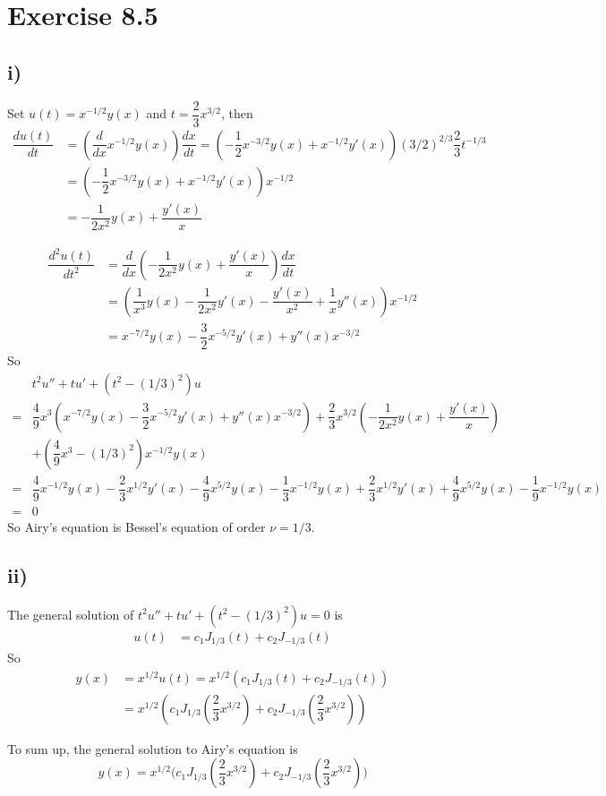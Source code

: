 \documentclass[a4paper,12pt,titlepage]{article}
\begin{document}
\section*{Exercise 8.5}
\subsection*{i)}
Set $u(t)=x^{-1/2}y(x)$ and $t=\dfrac{2}{3}x^{3/2}$, then
\begin{align*}
\dfrac{du(t)}{dt}&=(\dfrac{d}{dx}x^{-1/2}y(x))\dfrac{dx}{dt}=(-\dfrac{1}{2}x^{-3/2}y(x)+x^{-1/2}y'(x))(3/2)^{2/3}\dfrac{2}{3}t^{-1/3}\\
&=(-\dfrac{1}{2}x^{-3/2}y(x)+x^{-1/2}y'(x))x^{-1/2}\\
&=-\dfrac{1}{2x^2}y(x)+\dfrac{y'(x)}{x}
\end{align*}

\begin{align*}
\dfrac{d^2u(t)}{dt^2}&=\dfrac{d}{dx}(-\dfrac{1}{2x^2}y(x)+\dfrac{y'(x)}{x})\dfrac{dx}{dt}\\
&=(\dfrac{1}{x^3}y(x)-\dfrac{1}{2x^2}y'(x)-\dfrac{y'(x)}{x^2}+\dfrac{1}{x}y''(x))x^{-1/2}\\
&=x^{-7/2}y(x)-\dfrac{3}{2}x^{-5/2}y'(x)+y''(x)x^{-3/2}
\end{align*}
So
\begin{align*}
&t^2u''+tu'+(t^2-(1/3)^2)u\\
=&\dfrac{4}{9}x^3(x^{-7/2}y(x)-\dfrac{3}{2}x^{-5/2}y'(x)+y''(x)x^{-3/2})+\dfrac{2}{3}x^{3/2}(-\dfrac{1}{2x^2}y(x)+\dfrac{y'(x)}{x})\\
&+(\dfrac{4}{9}x^3-(1/3)^2)x^{-1/2}y(x)\\
=&\dfrac{4}{9}x^{-1/2}y(x)-\dfrac{2}{3}x^{1/2}y'(x)-\dfrac{4}{9}x^{5/2}y(x)-\dfrac{1}{3}x^{-1/2}y(x)+\dfrac{2}{3}x^{1/2}y'(x)+\dfrac{4}{9}x^{5/2}y(x)-\dfrac{1}{9}x^{-1/2}y(x)\\
=&0
\end{align*}
So Airy's equation is Bessel's equation of order $\nu = 1/3$.


\subsection*{ii)}
The general solution of $t^2u''+tu'+(t^2-(1/3)^2)u=0$ is
\begin{align*}
u(t)&=c_1J_{1/3}(t)+c_2J_{-1/3}(t)
\end{align*}
So 
\begin{align*}
y(x)&=x^{1/2}u(t)=x^{1/2}(c_1J_{1/3}(t)+c_2J_{-1/3}(t))\\
&=x^{1/2}(c_1J_{1/3}(\dfrac{2}{3}x^{3/2})+c_2J_{-1/3}(\dfrac{2}{3}x^{3/2}))
\end{align*}

To sum up, the general solution to Airy's equation is
$$y(x)=x^{1/2}\Big(c_1J_{1/3}(\dfrac{2}{3}x^{3/2})+c_2J_{-1/3}(\dfrac{2}{3}x^{3/2})\Big)$$
\end{document}
